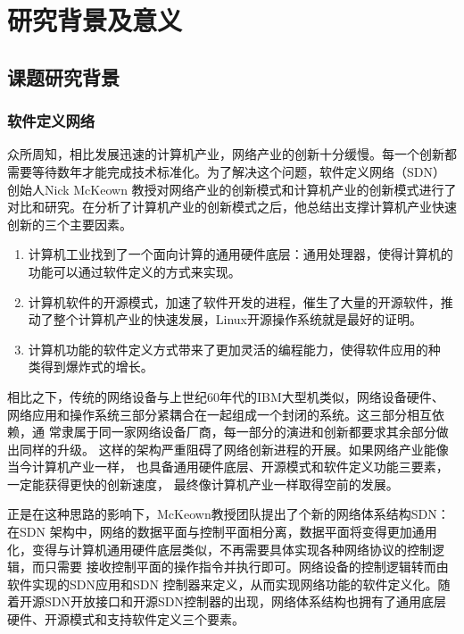 \section{研究背景及意义}
\subsection{课题研究背景}
\subsubsection{软件定义网络}
众所周知，相比发展迅速的计算机产业，网络产业的创新十分缓慢。每一个创新都 需要等待数年才能完成技术标准化。为了解决这个问题，软件定义网络（SDN）创始人Nick McKeown 教授对网络产业的创新模式和计算机产业的创新模式进行了对比和研究。在分析了计算机产业的创新模式之后，他总结出支撑计算机产业快速创新的三个主要因素。
\begin{enumerate}
  \item 计算机工业找到了一个面向计算的通用硬件底层：通用处理器，使得计算机的功能可以通过软件定义的方式来实现。
  \item 计算机软件的开源模式，加速了软件开发的进程，催生了大量的开源软件，推动了整个计算机产业的快速发展，Linux开源操作系统就是最好的证明。
  \item 计算机功能的软件定义方式带来了更加灵活的编程能力，使得软件应用的种 类得到爆炸式的增长。
\end{enumerate}

相比之下，传统的网络设备与上世纪60年代的IBM大型机类似，网络设备硬件、 网络应用和操作系统三部分紧耦合在一起组成一个封闭的系统。这三部分相互依赖，通 常隶属于同一家网络设备厂商，每一部分的演进和创新都要求其余部分做出同样的升级。 这样的架构严重阻碍了网络创新进程的开展。如果网络产业能像当今计算机产业一样， 也具备通用硬件底层、开源模式和软件定义功能三要素，一定能获得更快的创新速度， 最终像计算机产业一样取得空前的发展。

正是在这种思路的影响下，McKeown教授团队提出了个新的网络体系结构SDN\cite{mckeown2008openflow}： 在SDN 架构中，网络的数据平面与控制平面相分离，数据平面将变得更加通用化，变得与计算机通用硬件底层类似，不再需要具体实现各种网络协议的控制逻辑，而只需要 接收控制平面的操作指令并执行即可。网络设备的控制逻辑转而由软件实现的SDN应用和SDN 控制器来定义，从而实现网络功能的软件定义化。随着开源SDN开放接口和开源SDN控制器的出现，网络体系结构也拥有了通用底层硬件、开源模式和支持软件定义三个要素。

